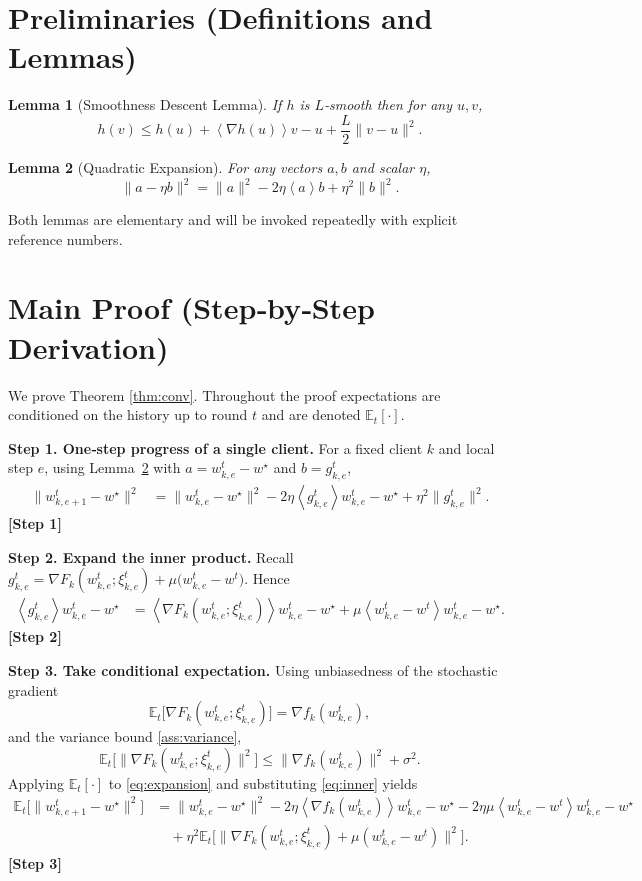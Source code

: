 \documentclass{article}
\newtheorem{lemma}{Lemma}
\newcommand{\EE}{\mathbb{E}}
\newcommand{\inner}[1]{\left\langle #1 \right\rangle}
\begin{document}
\newpage
\section*{Preliminaries (Definitions and Lemmas)}
\begin{lemma}[Smoothness Descent Lemma]\label{lem:smooth}
If $h$ is $L$‑smooth then for any $u,v$,
\[
h(v)\le h(u)+\inner{\nabla h(u)}{v-u}+\frac{L}{2}\|v-u\|^2 .
\]
\end{lemma}
\begin{lemma}[Quadratic Expansion]\label{lem:quad}
For any vectors $a,b$ and scalar $\eta$,
\[
\|a-\eta b\|^2=\|a\|^2-2\eta\inner{a}{b}+\eta^2\|b\|^2 .
\]
\end{lemma}
Both lemmas are elementary and will be invoked repeatedly with explicit reference numbers.

\section*{Main Proof (Step‑by‑Step Derivation)}
We prove Theorem \ref{thm:conv}.  Throughout the proof expectations are conditioned on the history up to round $t$ and are denoted $\EE_t[\cdot]$.

\bigskip
\noindent\textbf{Step 1.  One‑step progress of a single client.}  
For a fixed client $k$ and local step $e$, using Lemma~\ref{lem:quad} with $a=w^{t}_{k,e}-w^\star$ and $b=g^{t}_{k,e}$,
\begin{align}
\|w^{t}_{k,e+1}-w^\star\|^2
&=\|w^{t}_{k,e}-w^\star\|^2-2\eta\inner{g^{t}_{k,e}}{w^{t}_{k,e}-w^\star}
   +\eta^2\|g^{t}_{k,e}\|^2 . \label{eq:expansion}
\end{align}
\textbf{[Step 1]}

\noindent\textbf{Step 2.  Expand the inner product.}  
Recall $g^{t}_{k,e}= \nabla F_k(w^{t}_{k,e};\xi^{t}_{k,e})+\mu\big(w^{t}_{k,e}-w^{t}\big)$.  Hence
\begin{align}
\inner{g^{t}_{k,e}}{w^{t}_{k,e}-w^\star}
&=\inner{\nabla F_k(w^{t}_{k,e};\xi^{t}_{k,e})}{w^{t}_{k,e}-w^\star}
   +\mu\inner{w^{t}_{k,e}-w^{t}}{w^{t}_{k,e}-w^\star}. \label{eq:inner}
\end{align}
\textbf{[Step 2]}

\noindent\textbf{Step 3.  Take conditional expectation.}  
Using unbiasedness of the stochastic gradient
\[
\EE_t\!\big[\nabla F_k(w^{t}_{k,e};\xi^{t}_{k,e})\big]=\nabla f_k(w^{t}_{k,e}),
\]
and the variance bound \eqref{ass:variance},
\[
\EE_t\!\big[\| \nabla F_k(w^{t}_{k,e};\xi^{t}_{k,e})\|^2\big]
\le \|\nabla f_k(w^{t}_{k,e})\|^2+\sigma^2 . \label{eq:varbound}
\]
Applying $\EE_t[\cdot]$ to \eqref{eq:expansion} and substituting \eqref{eq:inner} yields
\begin{align}
\EE_t\!\big[\|w^{t}_{k,e+1}-w^\star\|^2\big]
&=\|w^{t}_{k,e}-w^\star\|^2
   -2\eta\inner{\nabla f_k(w^{t}_{k,e})}{w^{t}_{k,e}-w^\star}
   -2\eta\mu\inner{w^{t}_{k,e}-w^{t}}{w^{t}_{k,e}-w^\star}  \nonumber\\
&\quad +\eta^2\EE_t\!\big[\|\nabla F_k(w^{t}_{k,e};\xi^{t}_{k,e})+\mu(w^{t}_{k,e}-w^{t})\|^2\big]. \label{eq:exp1}
\end{align}
\textbf{[Step 3]}
\end{document}
